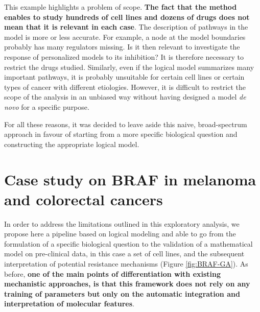 \documentclass[a4paper,12pt,twoside,onecolumn,openright,final,oldfontcommands]{memoir}
\begin{document}
This example highlights a problem of scope. \textbf{The fact that the
method enables to study hundreds of cell lines and dozens of drugs does
not mean that it is relevant in each case}. The description of pathways
in the model is more or less accurate. For example, a node at the model
boundaries probably has many regulators missing. Is it then relevant to
investigate the response of personalized models to its inhibition? It is
therefore necessary to restrict the drugs studied. Similarly, even if
the logical model summarizes many important pathways, it is probably
unsuitable for certain cell lines or certain types of cancer with
different etiologies. However, it is difficult to restrict the scope of
the analysis in an unbiased way without having designed a model \emph{de
novo} for a specific purpose.

For all these reasons, it was decided to leave aside this naive,
broad-spectrum approach in favour of starting from a more specific
biological question and constructing the appropriate logical model.

\section{Case study on BRAF in melanoma and colorectal
cancers}\label{case-study-on-braf-in-melanoma-and-colorectal-cancers}

In order to address the limitations outlined in this exploratory
analysis, we propose here a pipeline based on logical modeling and able
to go from the formulation of a specific biological question to the
validation of a mathematical model on pre-clinical data, in this case a
set of cell lines, and the subsequent interpretation of potential
resistance mechanisms (Figure \ref{fig:BRAF-GA}). As before, \textbf{one
of the main points of differentiation with existing mechanistic
approaches, is that this framework does not rely on any training of
parameters but only on the automatic integration and interpretation of
molecular features}.
\end{document}
